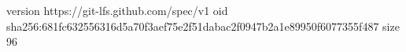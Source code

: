 version https://git-lfs.github.com/spec/v1
oid sha256:681fc632556316d5a70f3aef75e2f51dabac2f0947b2a1e89950f6077355f487
size 96
